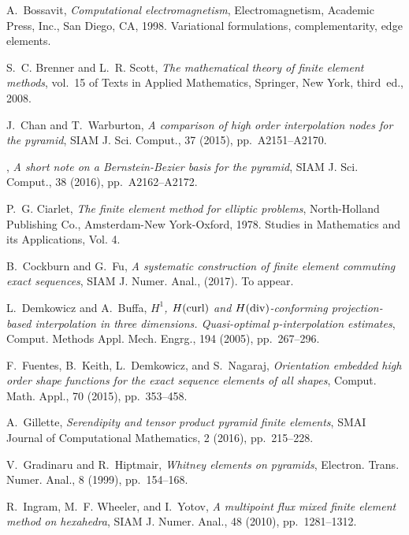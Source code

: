 \documentclass[twoside,reqno,final]{amsart}
\begin{document}
\begin{thebibliography}{10}
{\sc A.~Bossavit}, {\em Computational electromagnetism}, Electromagnetism,
  Academic Press, Inc., San Diego, CA, 1998.
\newblock Variational formulations, complementarity, edge elements.

{\sc S.~C. Brenner and L.~R. Scott}, {\em The mathematical theory of finite
  element methods}, vol.~15 of Texts in Applied Mathematics, Springer, New
  York, third~ed., 2008.

{\sc J.~Chan and T.~Warburton}, {\em A comparison of high order interpolation
  nodes for the pyramid}, SIAM J. Sci. Comput., 37 (2015), pp.~A2151--A2170.

\leavevmode\vrule height 2pt depth -1.6pt width 23pt, {\em A short note on a
  {B}ernstein-{B}ezier basis for the pyramid}, SIAM J. Sci. Comput., 38 (2016),
  pp.~A2162--A2172.

{\sc P.~G. Ciarlet}, {\em The finite element method for elliptic problems},
  North-Holland Publishing Co., Amsterdam-New York-Oxford, 1978.
\newblock Studies in Mathematics and its Applications, Vol. 4.

{\sc B.~Cockburn and G.~Fu}, {\em A systematic construction of finite element
  commuting exact sequences}, SIAM J. Numer. Anal.,  (2017).
\newblock To appear.

{\sc L.~Demkowicz and A.~Buffa}, {\em {$H^1$}, {$H({\rm curl})$} and {$H({\rm
  div})$}-conforming projection-based interpolation in three dimensions.
  {Q}uasi-optimal {$p$}-interpolation estimates}, Comput. Methods Appl. Mech.
  Engrg., 194 (2005), pp.~267--296.

{\sc F.~Fuentes, B.~Keith, L.~Demkowicz, and S.~Nagaraj}, {\em Orientation
  embedded high order shape functions for the exact sequence elements of all
  shapes}, Comput. Math. Appl., 70 (2015), pp.~353--458.

{\sc A.~Gillette}, {\em Serendipity and tensor product pyramid finite
  elements}, SMAI Journal of Computational Mathematics, 2 (2016), pp.~215--228.

{\sc V.~Gradinaru and R.~Hiptmair}, {\em Whitney elements on pyramids},
  Electron. Trans. Numer. Anal., 8 (1999), pp.~154--168.

{\sc R.~Ingram, M.~F. Wheeler, and I.~Yotov}, {\em A multipoint flux mixed
  finite element method on hexahedra}, SIAM J. Numer. Anal., 48 (2010),
  pp.~1281--1312.


\end{thebibliography}
\end{document}
